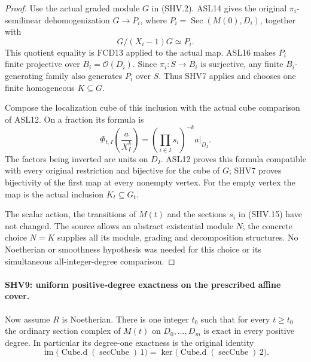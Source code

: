 \documentclass[11pt,a4paper]{article}
\numberwithin{equation}{section}
\theoremstyle{remark}\newtheorem{remark}[theorem]{Remark}
\begin{document}
\begin{proof}
Use the actual graded module $G$ in (SHV.2).
ASL14 gives the original $\pi_i$-semilinear dehomogenization
$G\to P_i$, where
$P_i=\operatorname{Sec}(M(0),D_i)$, together with
\[
                  G/(X_i-1)G\simeq P_i.                 \tag{SHV.14}
\]
This quotient equality is FCD13 applied to the actual map.
ASL16 makes $P_i$ finite projective over
$B_i=\mathcal O(D_i)$.  Since $\pi_i:S\to B_i$ is surjective,
any finite $B_i$-generating family also generates $P_i$ over $S$.
Thus SHV7 applies and chooses one finite homogeneous
$K\subseteq G$.

Compose the localization cube of this inclusion with the
actual cube comparison of ASL12.  On a fraction its formula is
\[
       \Phi_{t,I}\left(\frac{a}{X_I^k}\right)
              =\left(\prod_{i\in I}s_i\right)^{-k}a|_{D_I}.
                                                        \tag{SHV.15}
\]
The factors being inverted are units on $D_I$.  ASL12 proves
this formula compatible with every original restriction and
bijective for the cube of $G$; SHV7 proves bijectivity of the
first map at every nonempty vertex.  For the empty vertex the
map is the actual inclusion $K_t\subseteq G_t$.

The scalar action, the transitions of $M(t)$ and the sections
$s_i$ in (SHV.15) have not changed.  The source allows an
abstract existential module $N$; the concrete choice $N=K$
supplies all its module, grading and decomposition structures.
No Noetherian or smoothness hypothesis was needed for this
choice or its simultaneous all-integer-degree comparison.
\end{proof}

\paragraph{SHV9: uniform positive-degree exactness on the prescribed affine cover.}
\label{claim:SHV9}
Now assume $R$ is Noetherian.  There is one integer $t_0$ such
that for every $t\ge t_0$ the ordinary section complex of
$M(t)$ on $D_0,\ldots,D_m$ is exact in every positive degree.
In particular its degree-one exactness is the original identity
\[
 \operatorname{im}\bigl(\operatorname{Cube.d}(\operatorname{secCube})\,1\bigr)
 =\ker\bigl(\operatorname{Cube.d}(\operatorname{secCube})\,2\bigr).
                                                        \tag{SHV.16}
\]
\end{document}
